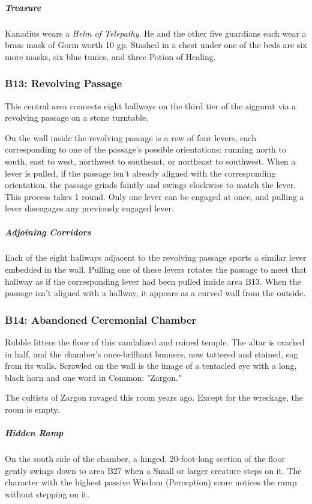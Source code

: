 \documentclass[10pt,a4paper,twoside,bg=print,twocolumn,openany,nodeprecatedcode]{dndbook}
\begin{document}
\subparagraph{Treasure}
Kanadius wears a \textit{Helm of Telepathy}. He and the other five guardians each wear a brass mask of Gorm worth 10 gp. Stashed in a chest under one of the beds are six more masks, six blue tunics, and three Potion of Healing.

\subsubsection{B13: Revolving Passage}
This central area connects eight hallways on the third tier of the ziggurat via a revolving passage on a stone turntable.

On the wall inside the revolving passage is a row of four levers, each corresponding to one of the passage's possible orientations: running north to south, east to west, northwest to southeast, or northeast to southwest. When a lever is pulled, if the passage isn't already aligned with the corresponding orientation, the passage grinds faintly and swings clockwise to match the lever. This process takes 1 round. Only one lever can be engaged at once, and pulling a lever disengages any previously engaged lever.

\subparagraph{Adjoining Corridors}
Each of the eight hallways adjacent to the revolving passage sports a similar lever embedded in the wall. Pulling one of these levers rotates the passage to meet that hallway as if the corresponding lever had been pulled inside area B13. When the passage isn't aligned with a hallway, it appears as a curved wall from the outside.

\subsubsection{B14: Abandoned Ceremonial Chamber}
\begin{DndReadAloud}{}
Rubble litters the floor of this vandalized and ruined temple. The altar is cracked in half, and the chamber's once-brilliant banners, now tattered and stained, sag from its walls. Scrawled on the wall is the image of a tentacled eye with a long, black horn and one word in Common: "Zargon."

\end{DndReadAloud}

The cultists of Zargon ravaged this room years ago. Except for the wreckage, the room is empty.

\subparagraph{Hidden Ramp}
On the south side of the chamber, a hinged, 20-foot-long section of the floor gently swings down to area B27 when a Small or larger creature steps on it. The character with the highest passive Wisdom (Perception) score notices the ramp without stepping on it.
\end{document}
